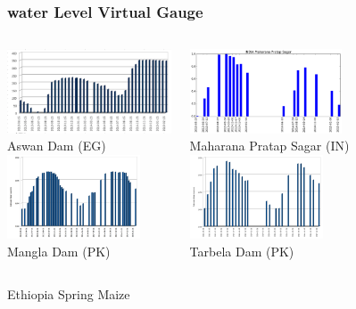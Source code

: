 \documentclass[serif,mathserif]{beamer}
\begin{document}
\begin{frame}
  \frametitle{water Level Virtual Gauge}
\begin{columns}
\begin{center}
\includegraphics[height=2.5cm]{EG_AswanDam}\\
 \small{Aswan Dam (EG)}\\
 \vspace {2mm}
 \includegraphics[height=2.5cm]{PK_Mangla_wLVG1}\\
 \small{Mangla Dam (PK)}
\end{center}

\begin{center}
 \includegraphics[height=2.5cm]{IN_Maharana_Pratap_Sagar_wLVG1}\\
 \small {Maharana Pratap Sagar (IN)}\\
 \vspace {2mm}
 \includegraphics[height=2.5cm]{PK_TarbelaDam_wLVG1}\\
 \small{Tarbela Dam (PK)}
\end{center}
\end{columns}
\end{frame}


{
\begin{frame}[plain]
\begin{shaded}
Ethiopia Spring Maize
\end{shaded}
\end{frame}}
\end{document}

